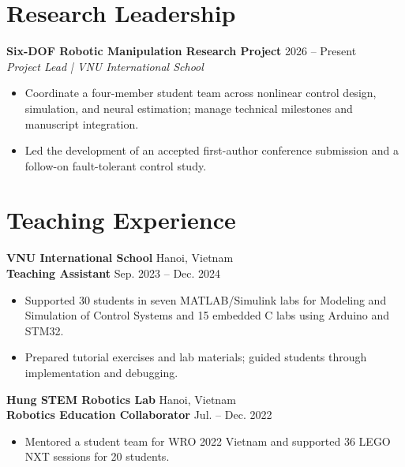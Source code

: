 \documentclass[11pt,a4paper]{article}
\newenvironment{expbullets}{\begin{itemize}[leftmargin=0.52cm,topsep=3pt,itemsep=2.3pt,parsep=0pt,partopsep=0pt,label={\textperiodcentered}]}{\end{itemize}}
\begin{document}
\section{Research Leadership}
\noindent\hspace*{0.22cm}\textbf{Six-DOF Robotic Manipulation Research Project} \hfill 2026 -- Present\\[-1pt]
\hspace*{0.22cm}\textit{Project Lead | VNU International School}\par
\begin{expbullets}
  \item Coordinate a four-member student team across nonlinear control design, simulation, and neural estimation; manage technical milestones and manuscript integration.
  \item Led the development of an accepted first-author conference submission and a follow-on fault-tolerant control study.
\end{expbullets}

\section{Teaching Experience}
\noindent\hspace*{0.22cm}\textbf{VNU International School} \hfill Hanoi, Vietnam\\[-1pt]
\hspace*{0.22cm}\textbf{Teaching Assistant} \hfill Sep. 2023 -- Dec. 2024\par
\begin{expbullets}
  \item Supported 30 students in seven MATLAB/Simulink labs for Modeling and Simulation of Control Systems and 15 embedded C labs using Arduino and STM32.
  \item Prepared tutorial exercises and lab materials; guided students through implementation and debugging.
\end{expbullets}
\vspace{3pt}
\noindent\hspace*{0.22cm}\textbf{Hung STEM Robotics Lab} \hfill Hanoi, Vietnam\\[-1pt]
\hspace*{0.22cm}\textbf{Robotics Education Collaborator} \hfill Jul. -- Dec. 2022\par
\begin{expbullets}
  \item Mentored a student team for WRO 2022 Vietnam and supported 36 LEGO NXT sessions for 20 students.
\end{expbullets}
\end{document}
